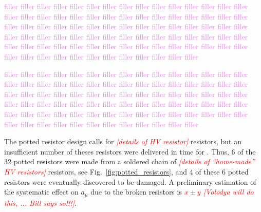 \textcolor{violet}{filler filler filler filler filler filler filler filler filler filler filler filler filler filler filler filler filler filler filler filler filler filler filler filler filler filler filler filler filler filler filler filler filler filler filler filler filler filler filler filler filler filler filler filler filler filler filler filler filler filler filler filler filler filler filler filler filler filler filler filler filler filler filler filler filler filler filler filler filler filler filler filler filler filler filler filler filler filler filler filler filler filler filler filler filler filler filler}

\textcolor{violet}{filler filler filler filler filler filler filler filler filler filler filler filler filler filler filler filler filler filler filler filler filler filler filler filler filler filler filler filler filler filler filler filler filler filler filler filler filler filler filler filler filler filler filler filler filler filler filler filler filler filler filler filler filler filler filler filler filler filler filler filler filler filler filler filler filler filler filler filler filler filler filler filler filler filler filler filler filler filler filler filler filler filler filler filler filler filler filler}

The potted resistor design calls for \textcolor{red}{\textit{[details of HV resistor]}} resistors, but an insufficient number of theses resistors were delivered in time for \runone. Thus, 6 of the 32 potted resistors were made from a soldered chain of \textcolor{red}{\textit{[details of ``home-made'' HV resistors]}} resistors, see Fig.~\ref{fig:potted_resistors}, and 4 of these 6 potted resistors were eventually discovered to be damaged. A preliminary estimation of the systematic effect on $a_{\mu}$ due to the broken resistors is \textcolor{red}{\textit{$x\pm y$ [Volodya will do this, ... Bill says so!!!]}}.
